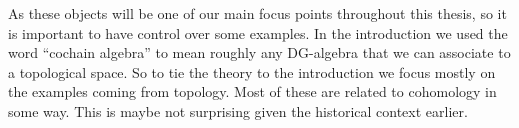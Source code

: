 

As these objects will be one of our main focus points throughout this thesis, so it is important to have control over some examples. In the introduction we used the word ``cochain algebra'' to mean roughly any DG-algebra that we can associate to a topological space. So to tie the theory to the introduction we focus mostly on the examples coming from topology. Most of these are related to cohomology in some way. This is maybe not surprising given the historical context earlier. 



